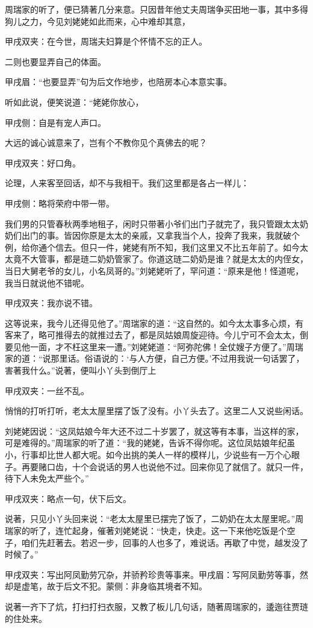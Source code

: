 \begin{parag}
    周瑞家的听了，便已猜著几分来意。只因昔年他丈夫周瑞争买田地一事，其中多得狗儿之力，今见刘姥姥如此而来，心中难却其意，\begin{note}甲戌双夹：在今世，周瑞夫妇算是个怀情不忘的正人。\end{note}二则也要显弄自己的体面。\begin{note}甲戌眉：“也要显弄”句为后文作地步，也陪房本心本意实事。\end{note}听如此说，便笑说道：“姥姥你放心，\begin{note}甲戌侧：自是有宠人声口。\end{note}大远的诚心诚意来了，岂有个不教你见个真佛去的呢？\begin{note}甲戌双夹：好口角。\end{note}论理，人来客至回话，却不与我相干。我们这里都是各占一样儿：\begin{note}甲戌侧：略将荣府中带一带。\end{note}我们男的只管春秋两季地租子，闲时只带著小爷们出门子就完了，我只管跟太太奶奶们出门的事。皆因你原是太太的亲戚，又拿我当个人，投奔了我来，我就破个例，给你通个信去。但只一件，姥姥有所不知，我们这里又不比五年前了。如今太太竟不大管事，都是琏二奶奶管家了。你道这琏二奶奶是谁？就是太太的内侄女，当日大舅老爷的女儿，小名凤哥的。”刘姥姥听了，罕问道：“原来是他！怪道呢，我当日就说他不错呢。\begin{note}甲戌双夹：我亦说不错。\end{note}这等说来，我今儿还得见他了。”周瑞家的道：“这自然的。如今太太事多心烦，有客来了，略可推得去的就推过去了，都是凤姑娘周旋迎待。今儿宁可不会太太，倒要见他一面，才不枉这里来一遭。”刘姥姥道：“阿弥陀佛！全仗嫂子方便了。”周瑞家的道：“说那里话。俗语说的：‘与人方便，自己方便。’不过用我说一句话罢了，害著我什么。”说著，便叫小丫头到倒厅上\begin{note}甲戌双夹：一丝不乱。\end{note}悄悄的打听打听，老太太屋里摆了饭了没有。小丫头去了。这里二人又说些闲话。
\end{parag}


\begin{parag}
    刘姥姥因说：“这凤姑娘今年大还不过二十岁罢了，就这等有本事，当这样的家，可是难得的。”周瑞家的听了道：“我的姥姥，告诉不得你呢。这位凤姑娘年纪虽小，行事却比世人都大呢。如今出挑的美人一样的模样儿，少说些有一万个心眼子。再要赌口齿，十个会说话的男人也说他不过。回来你见了就信了。就只一件，待下人未免太严些个。”\begin{note}甲戌双夹：略点一句，伏下后文。\end{note}说著，只见小丫头回来说：“老太太屋里已摆完了饭了，二奶奶在太太屋里呢。”周瑞家的听了，连忙起身，催著刘姥姥说：“快走，快走。这一下来他吃饭是个空子，咱们先赶著去。若迟一步，回事的人也多了，难说话。再歇了中觉，越发没了时候了。”\begin{note}甲戌双夹：写出阿凤勤劳冗杂，并骄矜珍贵等事来。甲戌眉：写阿凤勤劳等事，然却是虚笔，故于后文不犯。蒙侧：非身临其境者不知。\end{note}说著一齐下了炕，打扫打扫衣服，又教了板儿几句话，随著周瑞家的，逶迤往贾琏的住处来。
\end{parag}


